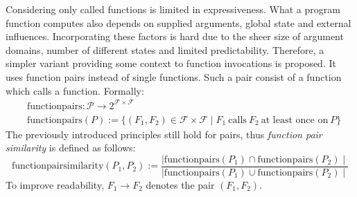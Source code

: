 \documentclass[a4paper, final, diplominf]{zih-template}
\begin{document}
Considering only called functions is limited in expressiveness.
What a program function computes also depends on supplied arguments, global state and external influences.
Incorporating these factors is hard due to the sheer size of argument domains, number of different states and limited predictability.
Therefore, a simpler variant providing some context to function invocations is proposed.
It uses function pairs instead of single functions.
Such a pair consist of a function which calls a function.
Formally:
\begin{equation*}
	\begin{aligned}
		& \text{functionpairs} : \mathcal{P} \to 2^{\mathcal{F} \times \mathcal{F}} \\
		& \text{functionpairs}(P) := \{ (F_1, F_2) \in \mathcal{F} \times \mathcal{F} \mid F_1~\text{calls}~F_2~\text{at least once on}~P \}
	\end{aligned}
\end{equation*}
The previously introduced principles still hold for pairs, thus \emph{function pair similarity} is defined as follows:
\begin{equation*}
	\text{functionpairsimilarity}(P_1, P_2) := \frac{ \mid \text{functionpairs}(P_1) \cap \text{functionpairs}(P_2) \mid }{ \mid \text{functionpairs}(P_1) \cup \text{functionpairs}(P_2) \mid }
\end{equation*}
To improve readability, $F_1 \rightarrow F_2$ denotes the pair $(F_1, F_2)$.
\end{document}
